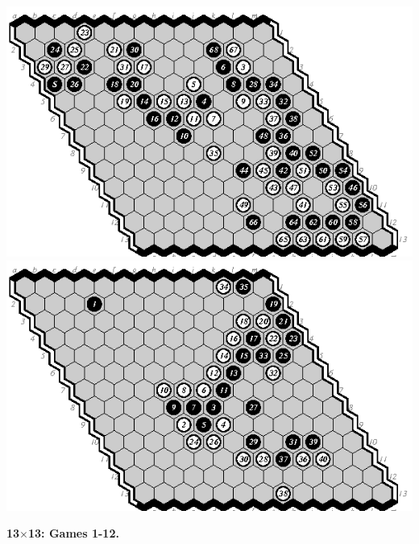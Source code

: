 \documentclass{icga}
\begin{document}
\includegraphics[scale=1.3]{13.11e-d.swap.eps}\hspace*{-2.5cm}\includegraphics[scale=1.3]{13.12d-m.eps}

{\bf 13$\times$13: Games 1-12.}

\ 
\end{document}
